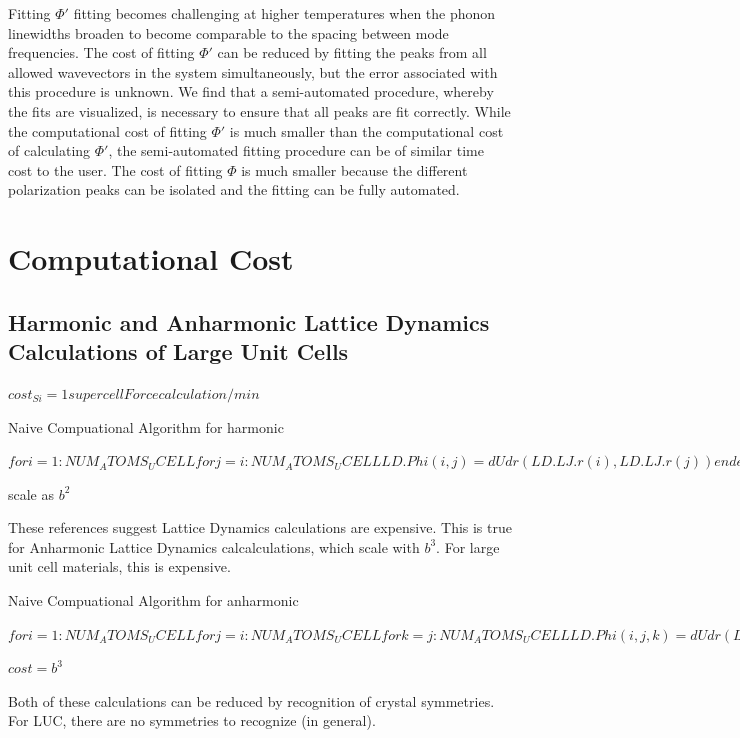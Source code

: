 \documentclass[letterpaper,12pt]{article}
\begin{document}
Fitting $\Phi'$ fitting becomes challenging at higher temperatures when the phonon linewidths broaden to become comparable to the spacing between mode frequencies. The cost of fitting $\Phi'$ can be reduced by fitting the peaks from all allowed wavevectors in the system simultaneously, but the error associated with this procedure is unknown.\cite{shiomi2011a} We find that a semi-automated procedure, whereby the fits are visualized, is necessary to ensure that all peaks are fit correctly.  While the computational cost of fitting $\Phi'$ is much smaller than the computational cost of calculating $\Phi'$, the semi-automated fitting procedure can be of similar time cost to the user. The cost of fitting $\Phi$ is much smaller because the different polarization peaks can be isolated and the fitting can be fully automated.

\section{\label{S-validation-samples}Computational Cost}

\subsection{\label{S-validation-samples}Harmonic and Anharmonic Lattice Dynamics Calculations of Large Unit Cells}


$cost_{Si} = 1 supercell Force calculation/min$

Naive Compuational Algorithm for harmonic

$for i=1:NUM_ATOMS_UCELL
	for j=i:NUM_ATOMS_UCELL
		LD.Phi(i,j) = dUdr(LD.LJ.r(i),LD.LJ.r(j))
	end
end$

scale as $b^2$

These references suggest Lattice Dynamics calculations are expensive.  This is true for Anharmonic Lattice Dynamics calcalculations, which scale with $b^3$. For large unit cell materials, this is expensive.

Naive Compuational Algorithm for anharmonic

$for i=1:NUM_ATOMS_UCELL
	for j=i:NUM_ATOMS_UCELL
			for k=j:NUM_ATOMS_UCELL
			LD.Phi(i,j,k) = dUdr(LD.LJ.r(i),LD.LJ.r(j),LD.LJ.r(k))
			end
	end
end$


$cost  = b^3$

Both of these calculations can be reduced by recognition of crystal symmetries.  For LUC, there are no symmetries to recognize (in general).
\end{document}
